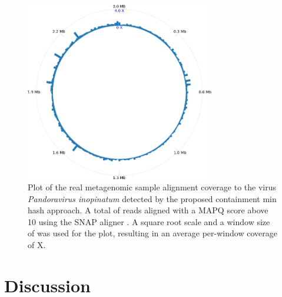 \documentclass[11pt]{amsart}
\theoremstyle{remark}
\numberwithin{equation}{section}
\begin{document}
\begin{figure}[!h]%
\begin{center}
\includegraphics[width=3.25in,trim={0 0 0 0in},clip]{Figs/CoveragePlot.png}%
\end{center}
\caption{Plot of the real metagenomic sample alignment coverage to the virus \textit{Pandoravirus inopinatum} detected by the proposed containment min hash approach. A total of  \protect reads aligned with a MAPQ score above 10 using the SNAP aligner \cite{zaharia2011faster}. A square root scale and a window size of \protect was used for the plot, resulting in an average per-window coverage of \protect \unskip X.
}
\label{fig:ViralCoverage}%
\end{figure}

\section{Discussion}


\clearpage
{}

\end{document}
